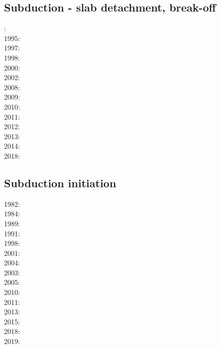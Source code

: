 \subsection*{Subduction - slab detachment, break-off}

: \cite{wosp92}\\
1995: \cite{yowo95}\\
1997: \cite{wowo97}\\
1998: \cite{desw98}\cite{caws98}\\
2000: \cite{wosp00}\\
2002: \cite{bugw02}\\
2008: \cite{zlfd08}\\
2009: \cite{anbi09}\cite{bubi09}\\
2010: \cite{bubi10}\\
2011: \cite{dugm11}\\
2012: \cite{dugk12}\cite{dusg12}\\
2013: \cite{care13}\cite{mafv13}\\
2014: \cite{dugs14}\cite{besr14}\\
2018: \cite{garm18}

\subsection*{Subduction initiation}

1982: \cite{clwv82}\\
1984: \cite{cade84}\\
1989: \cite{clwv89}\\
1991: \cite{muph91}\\
1998: \cite{togu98}\\
2001: \cite{dohe01}\cite{reyb01}\cite{brry01}\\
2004: \cite{ster04}\\
2003: \cite{hags03}\\
2005: \cite{bihi05}\\
2010: \cite{nigm10}\cite{bucl10}\\
2011: \cite{bagw11}\\
2013: \cite{dyge13}\\
2015: \cite{matv15}\\
2018: \cite{zhlg18}\\
2019: \cite{begb19}

